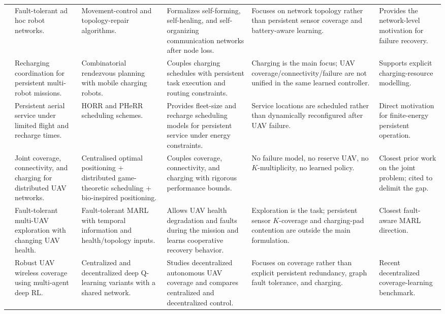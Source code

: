 \documentclass[conference]{IEEEtran}
\begin{document}
\begin{table}[t]
\begin{tabularx}{\textwidth}{@{}L{0.5cm}L{2.5cm}L{1.9cm}L{4.6cm}L{4.0cm}Y@{}}
\cite{basu2004} & Fault-tolerant ad hoc robot networks. & Movement-control and topology-repair algorithms. & Formalizes self-forming, self-healing, and self-organizing communication networks after node loss. & Focuses on network topology rather than persistent sensor coverage and battery-aware learning. & Provides the network-level motivation for failure recovery. \\
\cite{mathew2015} & Recharging coordination for persistent multi-robot missions. & Combinatorial rendezvous planning with mobile charging robots. & Couples charging schedules with persistent task execution and routing constraints. & Charging is the main focus; UAV coverage/connectivity/failure are not unified in the same learned controller. & Supports explicit charging-resource modelling. \\
\cite{arribas2023} & Persistent aerial service under limited flight and recharge times. & HORR and PHeRR scheduling schemes. & Provides fleet-size and recharge scheduling models for persistent service under energy constraints. & Service locations are scheduled rather than dynamically reconfigured after UAV failure. & Direct motivation for finite-energy persistent operation. \\
\cite{trotta2018} & Joint coverage, connectivity, and charging for distributed UAV networks. & Centralised optimal positioning + distributed game-theoretic scheduling + bio-inspired positioning. & Couples coverage, connectivity, and charging with rigorous performance bounds. & No failure model, no reserve UAV, no $K$-multiplicity, no learned policy. & Closest prior work on the joint problem; cited to delimit the gap. \\
\cite{jiang2024} & Fault-tolerant multi-UAV exploration with changing UAV health. & Fault-tolerant MARL with temporal information and health/topology inputs. & Allows UAV health degradation and faults during the mission and learns cooperative recovery behavior. & Exploration is the task; persistent sensor $K$-coverage and charging-pad contention are outside the main formulation. & Closest fault-aware MARL direction. \\
\cite{khan2025} & Robust UAV wireless coverage using multi-agent deep RL. & Centralized and decentralized deep Q-learning variants with a shared network. & Studies decentralized autonomous UAV coverage and compares centralized and decentralized control. & Focuses on coverage rather than explicit persistent redundancy, graph fault tolerance, and charging. & Recent decentralized coverage-learning benchmark. \\
\bottomrule
\end{tabularx}
\end{table}
\end{document}
